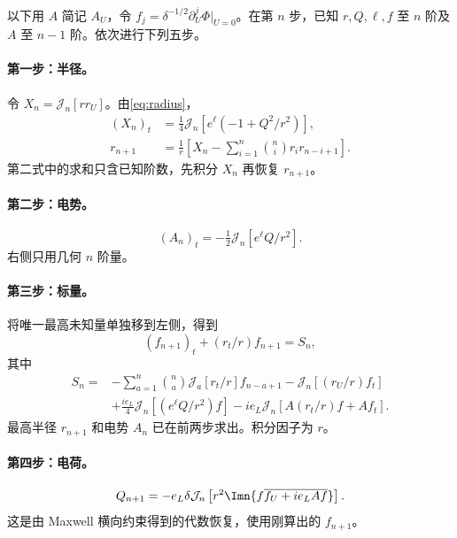 以下用 $A$ 简记 $A_U$，令 $f_j=\delta^{-1/2}\partial_U^j\Phi|_{U=0}$。在第 $n$ 步，已知 $r,Q,\ell,f$ 至 $n$ 阶及 $A$ 至 $n-1$ 阶。依次进行下列五步。

\paragraph{第一步：半径。}
令 $X_n=\mathcal J_n[rr_U]$。由\eqref{eq:radius}，
\begin{align}
(X_n)_t&=\tfrac14\mathcal J_n[e^\ell(-1+Q^2/r^2)],\label{eq:Xtransport}\\
r_{n+1}&=\frac1r\left[X_n-
\sum_{i=1}^n\binom ni r_i r_{n-i+1}\right].\label{eq:rrecover}
\end{align}
第二式中的求和只含已知阶数，先积分 $X_n$ 再恢复 $r_{n+1}$。

\paragraph{第二步：电势。}
\begin{equation}\label{eq:Atransport}
(A_n)_t=-\tfrac12\mathcal J_n[e^\ell Q/r^2].
\end{equation}
右侧只用几何 $n$ 阶量。

\paragraph{第三步：标量。}
将唯一最高未知量单独移到左侧，得到
\begin{equation}\label{eq:ftransport}
(f_{n+1})_t+(r_t/r)f_{n+1}=S_n,
\end{equation}
其中
\begin{equation}\label{eq:source}
\begin{aligned}
S_n={}&-\sum_{a=1}^n\binom na\mathcal J_a[r_t/r]f_{n-a+1}
-\mathcal J_n[(r_U/r)f_t]\\
&+\frac{ie_L}{4}\mathcal J_n[(e^\ell Q/r^2)f]
-ie_L\mathcal J_n[A(r_t/r)f+Af_t].
\end{aligned}
\end{equation}
最高半径 $r_{n+1}$ 和电势 $A_n$ 已在前两步求出。积分因子为 $r$。

\paragraph{第四步：电荷。}
\begin{equation}\label{eq:Qrecover}
Q_{n+1}=-e_L\delta\mathcal J_n
\left[r^2\Imn\{f\overline{f_U+ie_LAf}\}\right].
\end{equation}
这是由 Maxwell 横向约束得到的代数恢复，使用刚算出的 $f_{n+1}$。

